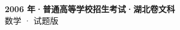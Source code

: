 \documentclass[zihao=-4, a4paper]{ctexart}
\begin{document}
\begin{center}
  {\Large\bfseries 2006 年·普通高等学校招生考试·湖北卷文科}\\[4pt]
  {\large 数学 · 试题版}
\end{center}
\medskip
{}

\end{document}
